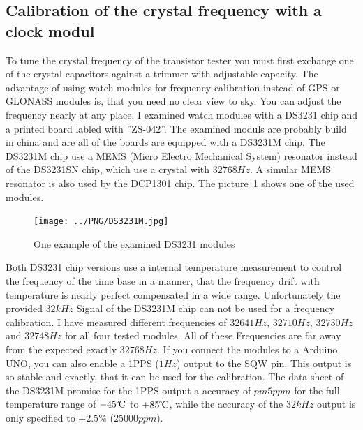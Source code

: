 \subsection{Calibration of the crystal frequency with a clock modul}

To tune the crystal frequency of the transistor tester you must first exchange one of the
crystal capacitors against a trimmer with adjustable capacity.
The advantage of using watch modules for frequency calibration instead of GPS or GLONASS modules is,
that you need no clear view to sky. You can adjust the frequency nearly at any place.
I examined watch modules with a DS3231 chip and a printed board labled with ''ZS-042''.
The examined moduls are probably build in china and are all of the boards are equipped
with a DS3231M chip. The DS3231M chip use a MEMS (Micro Electro Mechanical System) resonator 
instead of the DS3231SN chip, which use a crystal with \(32768Hz\).
A simular MEMS resonator is also used by the DCP1301 chip.
The picture~\ref{fig:DS3231M} shows one of the used modules.

\begin{figure}[H]
\centering
\texttt{[image: ../PNG/DS3231M.jpg]}
\caption{One example of the examined DS3231 modules}
\label{fig:DS3231M}
\end{figure}

Both DS3231 chip versions use a internal temperature measurement to control the frequency of
the time base in a manner, that the frequency drift with temperature is nearly
perfect compensated in a wide range.
Unfortunately the provided \(32kHz\) Signal of the DS3231M chip can not be used for a
frequency calibration. I have measured different frequencies of \(32641Hz\), \(32710Hz\),
\(32730Hz\) and \(32748Hz\) for all four tested modules. 
All of these Frequencies are far away from the expected exactly \(32768Hz\).
If you connect the modules to a Arduino UNO, you can also enable a 1PPS (\(1Hz\)) output
to the SQW pin.
This output is so stable and exactly, that it can be used for the calibration.
The data sheet of the DS3231M promise for the 1PPS output a accuracy of \(pm 5ppm\) for
the full temperature range of \(-45\celsius\) to \(+85\celsius\), while the accuracy of the
\(32kHz\) output is only specified to \(\pm 2.5\%\) (\(25000ppm\)).

